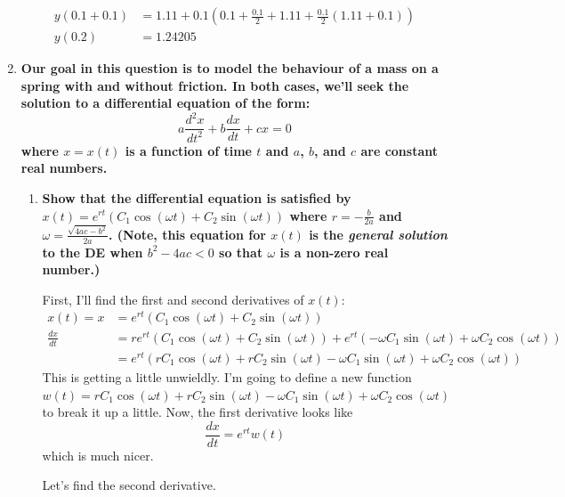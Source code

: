\documentclass[11pt]{article}
\begin{document}
\begin{enumerate}[label={\textbf{\arabic*.}}]
{\begin{enumerate}[label={\textbf{(\alph*)}}, resume]
{\begin{align*}
                        y(0.1+0.1)&=1.11+0.1\left(0.1+\frac{0.1}{2}+1.11+\frac{0.1}{2}(1.11+0.1)\right) \\
                        y(0.2)&=1.24205
                    \end{align*}
                }
            \end{enumerate}
        }
        \pagebreak
        \item{
            \textbf{\boldmath Our goal in this question is to model the behaviour of a mass on a spring with and without friction. In both cases, we'll seek the solution to a differential equation of the form: \begin{equation}a\frac{d^2x}{dt^2}+b\frac{dx}{dt}+cx=0\label{eqn:5}\end{equation} where $x=x(t)$ is a function of time $t$ and $a$, $b$, and $c$ are constant real numbers.}
            \begin{enumerate}[label={\textbf{(\alph*)}}]
                \item{
                    \label{part:5a}
                    \textbf{\boldmath Show that the differential equation is satisfied by $x(t)=e^{rt}(C_1\cos(\omega t)+C_2\sin(\omega t))$ where $r=-\frac{b}{2a}$ and $\omega=\frac{\sqrt{4ac-b^2}}{2a}$. (Note, this equation for $x(t)$ is the \textit{general solution} to the DE when $b^2-4ac<0$ so that $\omega$ is a non-zero real number.)}
                    \par
                    First, I'll find the first and second derivatives of $x(t)$:
                    \begin{align*}
                        x(t)=x&=e^{rt}(C_1\cos(\omega t)+C_2\sin(\omega t)) \\[8pt]
                        \frac{dx}{dt}&=re^{rt}(C_1\cos(\omega t)+C_2\sin(\omega t))+e^{rt}(-\omega C_1\sin(\omega t)+\omega C_2\cos(\omega t)) \\
                        &=e^{rt}(rC_1\cos(\omega t)+rC_2\sin(\omega t)-\omega C_1\sin(\omega t)+\omega C_2\cos(\omega t))
                    \end{align*}
                    This is getting a little unwieldly. I'm going to define a new function $w(t)=rC_1\cos(\omega t)+rC_2\sin(\omega t)-\omega C_1\sin(\omega t)+\omega C_2\cos(\omega t)$ to break it up a little. Now, the first derivative looks like
                    $$\frac{dx}{dt}=e^{rt}w(t)$$
                    which is much nicer.
                    \par
                    Let's find the second derivative.
}
\end{enumerate}}
\end{enumerate}
\end{document}
